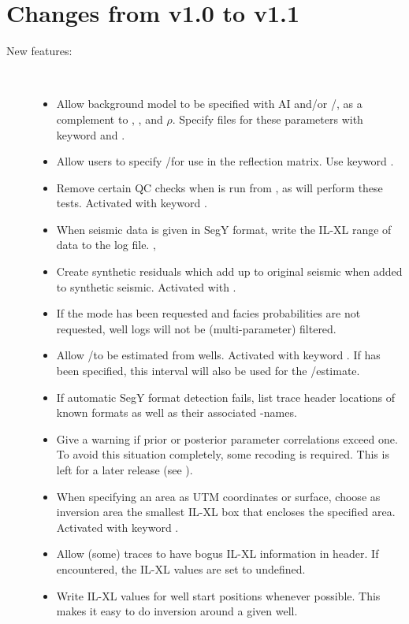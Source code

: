 \section{Changes from v1.0 to v1.1}

\begin{description}

\item [New features:] \mbox{ }
  \begin{itemize}
    \item Allow background model to be specified with AI and\!/\!or
      \vp/\vs, as a complement to \vp, \vs, and $\rho$. Specify files
      for these parameters with keyword  and
      . 
    \item Allow users to specify \vp/\vs for use in the
      reflection matrix.  Use keyword . 
    \item Remove certain QC checks when \crava is run from
      \rms, as \rms will perform these tests. Activated with keyword
      . 
    \item When seismic data is given in SegY format, write the IL-XL
      range of data to the log file. , 
    \item Create synthetic residuals which add up to original seismic
      when added to synthetic seismic. Activated with
      . 
    \item If the  mode has been requested and
      facies probabilities are not requested, well logs will not be
      (multi-parameter) filtered. 
    \item Allow \vp/\vs to be estimated from wells. Activated
      with keyword . If
       has been specified, this
      interval will also be used for the \vp/\vs estimate. 
    \item If automatic SegY format detection fails, list trace
      header locations of known formats as well as their associated
      \crava-names. 
    \item Give a warning if prior or posterior parameter correlations
      exceed one. To avoid this situation completely, some recoding is
      required. This is left for a later release (see
      ). 
    \item When specifying an area as UTM coordinates or surface,
      choose as inversion area the smallest IL-XL box that
      encloses the specified area. Activated with keyword
      . 
    \item Allow (some) traces to have bogus IL-XL information in
      header. If encountered, the IL-XL values are set to
      undefined. 
    \item Write IL-XL values for well start positions whenever
      possible. This makes it easy to do inversion around a given
      well. 
 \end{itemize}


\end{description}
